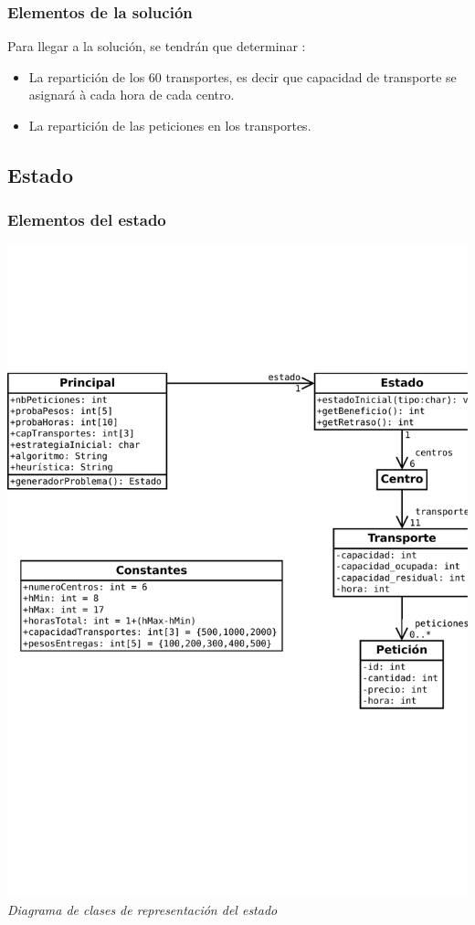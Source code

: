 \documentclass{article}
\begin{document}
\subsubsection{Elementos de la solución}
Para llegar a la solución, se tendrán que determinar :
\begin{itemize}
\item La repartición de los 60 transportes, es decir que capacidad de transporte
se asignará à cada hora de cada centro.
\item La repartición de las peticiones en los transportes.
\end{itemize}

\subsection{Estado}
\subsubsection{Elementos del estado}
\begin{center} \includegraphics[width=16cm]{clases}\\
{\it Diagrama de clases de representación del estado} \end{center}
\end{document}

